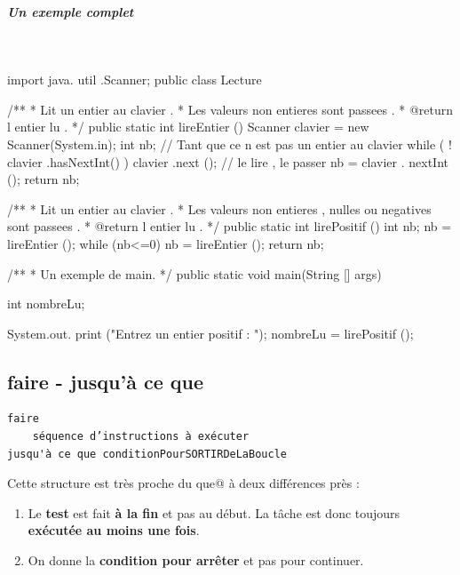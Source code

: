 \documentclass[11pt,a4paper]{article}
\begin{document}
			
		\subparagraph{Un exemple complet} 
		
					\textcolor{white}{.} \par
				
            \par
        \begin{Java}
import java. util .Scanner;
public class Lecture {
    /**
    * Lit un entier au clavier .
    * Les valeurs non entieres sont passees .
    * @return l entier lu .
    */
    public static int lireEntier () {
      Scanner clavier = new Scanner(System.in);
      int nb;
      // Tant que ce n  est pas un entier au clavier
      while ( ! clavier .hasNextInt() ) {
        clavier .next (); // le lire , le passer
      }
      nb = clavier . nextInt ();
      return nb;
    }

    /**
    * Lit un entier au clavier .
    * Les valeurs non entieres , nulles ou negatives sont passees .
    * @return l entier lu .
    */
    public static int lirePositif () {
      int nb;
      nb = lireEntier ();
      while (nb<=0) {
        nb = lireEntier ();
      }
      return nb;
    }

    /**
    * Un exemple de main.
    */
    public static void main(String [] args){
      int nombreLu;
      
      System.out. print ("Entrez un entier  positif : ");
      nombreLu = lirePositif ();
    }
}\end{Java}\subsection{faire - jusqu'\`a ce que}\begin{verbatim}
faire
    séquence d’instructions à exécuter
jusqu'à ce que conditionPourSORTIRDeLaBoucle
      \end{verbatim}
        Cette structure est tr\`es proche du \guillemotleft  \verb@tant que@ \guillemotright  \`a deux diff\'erences pr\`es :
        
					\begin{enumerate}
				
			\item 
            Le \textbf{test} est fait \textbf{\`a la fin} et pas au d\'ebut. 
            La t\^ache est donc toujours \textbf{ex\'ecut\'ee au moins une fois}.
          
			\item On donne la \textbf{condition pour arr\^eter} et pas pour continuer.
					\end{enumerate}
				
\end{document}
